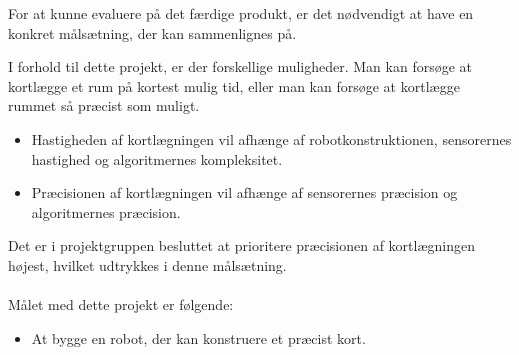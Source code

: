 For at kunne evaluere på det færdige produkt, er det nødvendigt at have en konkret målsætning, der kan sammenlignes på. 

I forhold til dette projekt, er der forskellige muligheder.
Man kan forsøge at kortlægge et rum på kortest mulig tid, eller man kan forsøge at kortlægge rummet så præcist som muligt.

\begin{itemize}
\item Hastigheden af kortlægningen vil afhænge af robotkonstruktionen, sensorernes hastighed og algoritmernes kompleksitet.
\item Præcisionen af kortlægningen vil afhænge af sensorernes præcision og algoritmernes præcision.
\end{itemize}
Det er i projektgruppen besluttet at prioritere præcisionen af kortlægningen højest, hvilket udtrykkes i denne målsætning.

\paragraph{}
\noindent Målet med dette projekt er følgende:
\begin{itemize}
\item At bygge en robot, der kan konstruere et præcist kort.
\end{itemize}